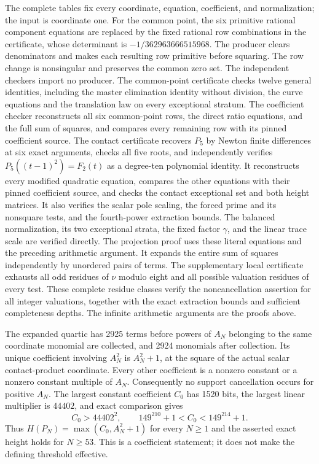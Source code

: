 \documentclass[11pt,a4paper]{article}
\begin{document}
The complete tables fix every coordinate, equation, coefficient, and
normalization; the input is coordinate one. For the common point,
the six primitive rational component equations are replaced by the
fixed rational row combinations in the certificate, whose determinant
is $-1/362963666515968$. The producer clears denominators and makes
each resulting row primitive before squaring. The row change is
nonsingular and preserves the common zero set.
The independent checkers import no producer. The common-point
certificate checks twelve general identities, including the master
elimination identity without division, the curve equations and the
translation law on every exceptional stratum. The coefficient checker
reconstructs all six common-point rows, the direct ratio equations,
and the full sum of squares, and compares every remaining row with
its pinned coefficient source. The contact certificate recovers $P_5$ by
Newton finite differences at six exact arguments, checks all five roots,
and independently verifies $P_5((t-1)^2)=F_2(t)$ as a degree-ten
polynomial identity. It reconstructs every modified quadratic equation,
compares the other equations with their pinned coefficient source, and
checks the contact exceptional set and both height matrices. It also verifies the scalar pole scaling, the forced prime and its nonsquare tests, and the fourth-power extraction bounds.
The balanced normalization, its two exceptional strata, the fixed factor $\gamma$, and the linear trace scale are verified directly.
The projection proof uses these literal equations and the preceding
arithmetic argument.
It expands the entire sum of squares independently by unordered
pairs of terms. The supplementary local certificate exhausts all
odd residues of $\nu$ modulo eight and all possible valuation residues
of every test. These complete residue classes verify the
noncancellation assertion for all integer valuations, together with
the exact extraction bounds and sufficient completeness depths.
The infinite arithmetic arguments are the proofs above.

The expanded quartic has 2925 terms before powers of $A_N$ belonging
to the same coordinate monomial are collected, and 2924 monomials
after collection. Its unique coefficient involving $A_N^2$ is
$A_N^2+1$, at the square of the actual scalar contact-product coordinate.
Every other coefficient is a nonzero constant or a nonzero constant
multiple of $A_N$. Consequently no support cancellation occurs for
positive $A_N$. The largest constant coefficient $C_0$ has 1520 bits,
the largest linear multiplier is $44402$, and exact comparison
gives
\[
 C_0>44402^2,\qquad
 149^{210}+1<C_0<149^{214}+1.
\]
Thus $H(P_N)=\max(C_0,A_N^2+1)$ for every $N\ge1$ and the asserted
exact height holds for $N\ge53$. This is a coefficient statement;
it does not make the defining threshold effective.
\end{document}
